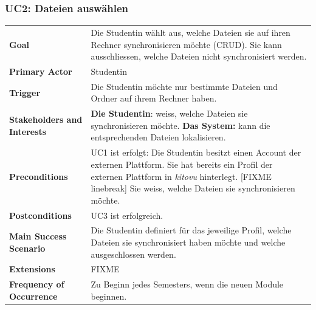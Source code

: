 \documentclass[a4paper]{article}
\begin{document}
\subsubsection{UC2: Dateien auswählen}
\begin{tabulary}{\linewidth}{lp{30em}}
	\textbf{Goal} & Die Studentin wählt aus, welche Dateien sie auf ihren Rechner synchronisieren möchte (CRUD). Sie kann ausschliessen, welche Dateien nicht synchronisiert werden.\\
	\textbf{Primary Actor} & Studentin\\
	\textbf{Trigger} & Die Studentin möchte nur bestimmte Dateien und Ordner auf ihrem Rechner haben.\\
	\textbf{Stakeholders and Interests} & \textbf{Die Studentin}: weiss, welche Dateien sie synchronisieren möchte. \textbf{Das System:} kann die entsprechenden Dateien lokalisieren. \\
	\textbf{Preconditions} & UC1 ist erfolgt: Die Studentin besitzt einen Account der externen Plattform. Sie hat bereits ein Profil der externen Plattform in \emph{kitovu} hinterlegt. [FIXME linebreak] Sie weiss, welche Dateien sie synchronisieren möchte. \\
	\textbf{Postconditions} & UC3 ist erfolgreich.\\
	\textbf{Main Success Scenario} & Die Studentin definiert für das jeweilige Profil, welche Dateien sie synchronisiert haben möchte und welche ausgeschlossen werden. \\
	\textbf{Extensions} & FIXME\\
	\textbf{Frequency of Occurrence} & Zu Beginn jedes Semesters, wenn die neuen Module beginnen. \\
\end{tabulary}
\end{document}
